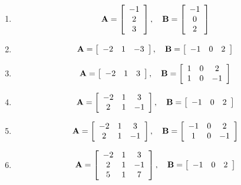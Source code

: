 \documentclass[13pt]{article}\usepackage[]{graphicx}\usepackage[]{color}
\begin{document}
{\begin{enumerate}
  \begin{enumerate}
      \item 
      \[ {\bf A} = \left[\begin{array}{c} -1 \\ 2 \\ 3 \end{array} \right], \ \ \ {\bf B} = \left[\begin{array}{c} -1 \\ 0 \\ 2 \end{array} \right] \]
      \item 
      \[ {\bf A} = \left[\begin{array}{ccc} -2 & 1 & -3 \end{array} \right], \ \ \ {\bf B} = \left[\begin{array}{ccc} -1 & 0 & 2 \end{array} \right] \]
      \item 
      \[ {\bf A} = \left[\begin{array}{ccc} -2 & 1 & 3 \end{array} \right], \ \ \ {\bf B} = \left[\begin{array}{ccc} 1 & 0 & 2 \\ 1 & 0 & -1 \end{array} \right] \]
      \item 
      \[ {\bf A} = \left[\begin{array}{ccc} -2 & 1 & 3 \\ 2 & 1 & -1 \end{array} \right], \ \ \ {\bf B} = \left[\begin{array}{ccc} -1 & 0 & 2 \end{array} \right] \]
      \item 
      \[ {\bf A} = \left[\begin{array}{ccc} -2 & 1 & 3 \\ 2 & 1 & -1 \end{array} \right], \ \ \ {\bf B} = \left[\begin{array}{ccc} -1 & 0 & 2 \\ 1 & 0 & -1 \end{array} \right]\]
      \item 
      \[ {\bf A} = \left[\begin{array}{ccc} -2 & 1 & 3 \\ 2 & 1 & -1 \\ 5 & 1 & 7 \end{array} \right], \ \ \ {\bf B} = \left[\begin{array}{ccc} -1 & 0 & 2 \end{array} \right] \]

\end{enumerate}
\end{enumerate}}
\end{document}
